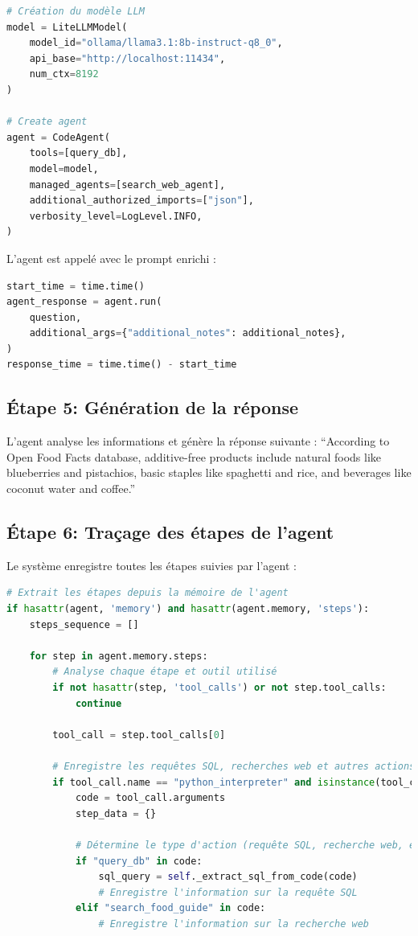 \documentclass[a4paper,11pt]{article}
\begin{document}
\begin{lstlisting}[language=Python, caption=Création de l'agent]
# Création du modèle LLM
model = LiteLLMModel(
    model_id="ollama/llama3.1:8b-instruct-q8_0",
    api_base="http://localhost:11434",
    num_ctx=8192
)

# Create agent
agent = CodeAgent(
    tools=[query_db],
    model=model,
    managed_agents=[search_web_agent],
    additional_authorized_imports=["json"],
    verbosity_level=LogLevel.INFO,
)
\end{lstlisting}

L'agent est appelé avec le prompt enrichi :

\begin{lstlisting}[language=Python, caption=Exécution
de l'agent avec les notes additionnelles]
start_time = time.time()
agent_response = agent.run(
    question,
    additional_args={"additional_notes": additional_notes},
)
response_time = time.time() - start_time
\end{lstlisting}

\subsection*{Étape 5: Génération de la réponse}

L'agent analyse les informations et génère la réponse suivante : 
\enquote{According to Open Food Facts database, additive-free products include natural 
foods like blueberries and pistachios, basic staples like spaghetti and rice, 
and beverages like coconut water and coffee.}

\newpage
\subsection*{Étape 6: Traçage des étapes de l'agent}

Le système enregistre toutes les étapes suivies par l'agent :

\begin{lstlisting}[language=Python, caption=Traçage des étapes de l'agent]
# Extrait les étapes depuis la mémoire de l'agent
if hasattr(agent, 'memory') and hasattr(agent.memory, 'steps'):
    steps_sequence = []
    
    for step in agent.memory.steps:
        # Analyse chaque étape et outil utilisé
        if not hasattr(step, 'tool_calls') or not step.tool_calls:
            continue
            
        tool_call = step.tool_calls[0]
        
        # Enregistre les requêtes SQL, recherches web et autres actions
        if tool_call.name == "python_interpreter" and isinstance(tool_call.arguments, str):
            code = tool_call.arguments
            step_data = {}
            
            # Détermine le type d'action (requête SQL, recherche web, etc.)
            if "query_db" in code:
                sql_query = self._extract_sql_from_code(code)
                # Enregistre l'information sur la requête SQL
            elif "search_food_guide" in code:
                # Enregistre l'information sur la recherche web
\end{lstlisting}
\end{document}

